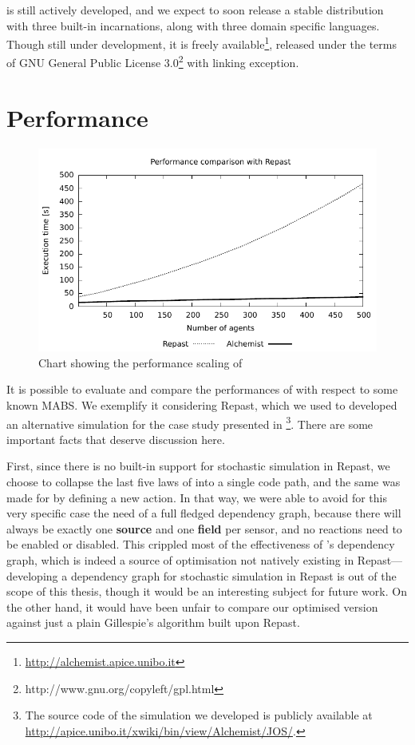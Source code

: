 \documentclass[12pt,a4paper,twoside,openright]{book}
\begin{document}
\alchemist{} is still actively developed, and we expect to soon release a stable distribution with three built-in incarnations, along with three domain specific languages.
%
Though still under development, it is freely available\footnote{\url{http://alchemist.apice.unibo.it}}, released under the terms of GNU General Public License 3.0\footnote{http://www.gnu.org/copyleft/gpl.html} with linking exception.

\section{Performance}

\begin{figure}[t]
    \includegraphics[width=0.999999\columnwidth]{img/jos-graph01}
    \caption{Chart showing the performance scaling of \alchemist{}}
    \label{img:repastperf}
\end{figure}

It is possible to evaluate and compare the performances of \alchemist{} with respect to some known MABS.
%
We exemplify it considering Repast, which we used to developed an alternative simulation for the case study presented in \footnote{The source code of the simulation we developed is publicly available at \mbox{\url{http://apice.unibo.it/xwiki/bin/view/Alchemist/JOS/}.}}. There are some important facts that deserve discussion here.

First, since there is no built-in support for stochastic simulation in Repast, we choose to collapse the last five laws of  into a single code path, and the same was made for \alchemist{} by defining a new action.
%
In that way, we were able to avoid for this very specific case the need of a full fledged dependency graph, because there will always be exactly one \textbf{source} and one \textbf{field} per sensor, and no reactions need to be enabled or disabled.
%
This crippled most of the effectiveness of \alchemist{}'s dependency graph, which is indeed a source of optimisation not natively existing in Repast---developing a dependency graph for stochastic simulation in Repast is out of the scope of this thesis, though it would be an interesting subject for future work.
%
On the other hand, it would have been unfair to compare our optimised version against just a plain Gillespie's algorithm built upon Repast.
\end{document}

